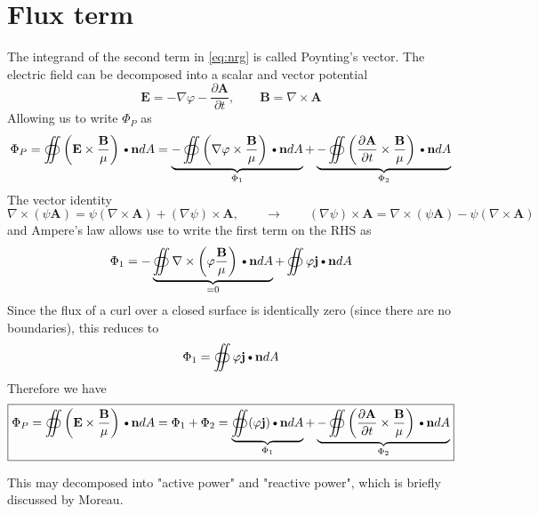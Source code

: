 \documentclass[11pt]{article}
\newcommand{\A}{\mathbf{A}}
\newcommand{\B}{\mathbf{B}}
\newcommand{\PD}{\partial}
\newcommand{\BM}{\frac{\mathbf{B}}{\mu}}
\newcommand{\J}{\mathbf{j}}
\newcommand{\E}{\mathbf{E}}
\newcommand{\N}{\mathbf{n}}
\newcommand{\DOT}{\text{\textbullet}}
\begin{document}
\section{Flux term}
The integrand of the second term in \ref{eq:nrg} is called Poynting's vector. The electric field can be decomposed into a scalar and vector potential
\begin{equation}
	\E = -\nabla \varphi - \frac{\PD \A}{\PD t}, \qquad \B = \nabla \times \A
\end{equation}
Allowing us to write $\Phi_P$ as
\begin{equation}
	\Phi_P = \oiint \left( \E \times \BM \right) \DOT \N dA =
	\underbrace{- \oiint \left( \nabla \varphi \times \BM \right) \DOT \N dA}_{\Phi_1} +
	\underbrace{- \oiint \left( \frac{\PD \A}{\PD t} \times \BM \right) \DOT \N dA}_{\Phi_2}
\end{equation}
The vector identity
\begin{equation}
	\nabla \times (\psi \A) = \psi (\nabla \times \A) + (\nabla \psi) \times \A
	, \qquad \rightarrow \qquad
	(\nabla \psi) \times \A = \nabla \times (\psi \A) - \psi (\nabla \times \A)
\end{equation}
and Ampere's law allows use to write the first term on the RHS as
\begin{equation}
	\Phi_1 = - \underbrace{\oiint \nabla \times \left(\varphi \BM \right) \DOT \N dA}_{= 0}
	+ \oiint \varphi \J \DOT \N dA
\end{equation}
Since the flux of a curl over a closed surface is identically zero (since there are no boundaries), this reduces to
\begin{equation}
	\Phi_1 = \oiint \varphi \J \DOT \N dA
\end{equation}
Therefore we have
\begin{equation}
	\boxed{
	\Phi_P = \oiint \left( \E \times \BM \right) \DOT \N dA = \Phi_1 + \Phi_2 = 
	\underbrace{\oiint (\varphi \J) \DOT \N dA}_{\Phi_1} +
	\underbrace{- \oiint \left( \frac{\PD \A}{\PD t} \times \BM \right) \DOT \N dA}_{\Phi_2}
	}
\end{equation}

This may decomposed into "active power" and "reactive power", which is briefly discussed by Moreau.
\end{document}
